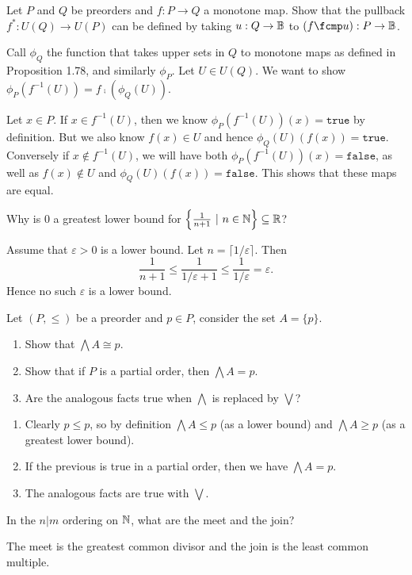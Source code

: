 Let $P$ and $Q$ be preorders and $f:P\to Q$ a monotone map.  Show that the pullback $f^*:U(Q)\to U(P)$ can be defined by taking $u:Q\to\mathbb{B}$ to $(f\fcmp u):P\to\B$.

\solution
Call $\phi_Q$ the function that takes upper sets in $Q$ to monotone maps as defined in Proposition 1.78, and similarly $\phi_P$.  Let $U\in U(Q)$.  We want to show $\phi_P(f^{-1}(U)) = f\fcmp (\phi_Q(U))$.

Let $x\in P$.  If $x\in f^{-1}(U)$, then we know $\phi_P(f^{-1}(U))(x)=\texttt{true}$ by definition.  But we also know $f(x)\in U$ and hence $\phi_Q(U)(f(x)) = \texttt{true}$.  Conversely if $x\not\in f^{-1}(U)$, we will have both $\phi_P(f^{-1}(U))(x)=\texttt{false}$, as well as $f(x)\not\in U$ and $\phi_Q(U)(f(x)) = \texttt{false}$.  This shows that these maps are equal.

Why is 0 a greatest lower bound for $\left\{\frac{1}{n+1}\ |\ n\in\N\right\}\subseteq\R$?

\solution
Assume that $\varepsilon > 0$ is a lower bound. Let $n=\lceil 1 / \varepsilon \rceil$.  Then
\[
	\frac{1}{n+1}\leq \frac{1}{1 / \varepsilon +1} \leq \frac{1}{1/\varepsilon}=\varepsilon.
\]
Hence no such $\varepsilon$ is a lower bound.

Let $(P, \leq)$ be a preorder and $p\in P$, consider the set $A=\{p\}$.
\begin{enumerate}
	\item Show that $\bigwedge A \cong p$.
	\item Show that if $P$ is a partial order, then $\bigwedge A = p$.
	\item Are the analogous facts true when $\bigwedge$ is replaced by $\bigvee$?
\end{enumerate}

\solution
\begin{enumerate}
	\item Clearly $p\leq p$, so by definition $\bigwedge A \leq p$ (as a lower bound) and $\bigwedge A\geq p$ (as a greatest lower bound).
	\item If the previous is true in a partial order, then we have $\bigwedge A = p$.
	\item The analogous facts are true with $\bigvee$.
\end{enumerate}

In the $n|m$ ordering on $\mathbb{N}$, what are the meet and the join?

\solution
The meet is the greatest common divisor and the join is the least common multiple.

